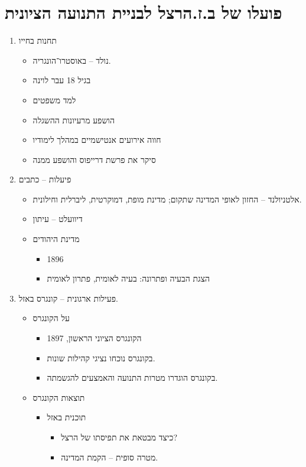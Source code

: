 \documentclass[]{article}
\begin{document}
	\section{פועלו של ב.ז.הרצל לבניית התנועה הציונית}
	\begin{multicols}{2}
		\begin{enumerate}
			\item תחנות בחייו
			\begin{itemize}
				\item נולד – באוסטרו־הונגריה.
				\item בגיל 18 עבר לוינה
				\item למד משפטים
				\item הושפע מרעיונות ההשגלה
				\item חווה אירועים אנטישמיים במהלך לימודיו
				\item סיקר את פרשת דרייפוס והושפע ממנה
			\end{itemize}
			\item פיעלות – כתבים
			\begin{itemize}
				\item אלטניולנד – החזון לאופי המדינה שתקום; מדינת מופת, דמוקרטית, ליברלית וחילונית. 
				\item דיוועלט – עיתון
				\item מדינת היהודים
				\begin{itemize}
					\item 1896
					\item הצגת הבעיה ופתרונה: בעיה לאומית, פתרון לאומית
				\end{itemize}
			\end{itemize}
			\item פעילות ארגונית – קונגרס באזל. 
			\begin{itemize}
				\item על הקונגרס
				\begin{itemize}
					\item הקונגרס הציוני הראשון, 1897
					\item בקונגרס נוכחו נציגי קהילות שונות. 
					\item בקונגרס הוגדרו מטרות התנועה והאמצעים להגשמתה. 
				\end{itemize}
				\item תוצאות הקונגרס
				\begin{itemize}
					\item תוכנית באזל
					\begin{itemize}
						\item כיצד מבטאת את תפיסתו של הרצל? 
						\item מטרה סופית – הקמת המדינה. 

\end{itemize}
\end{itemize}
\end{itemize}
\end{enumerate}
\end{multicols}
\end{document}
